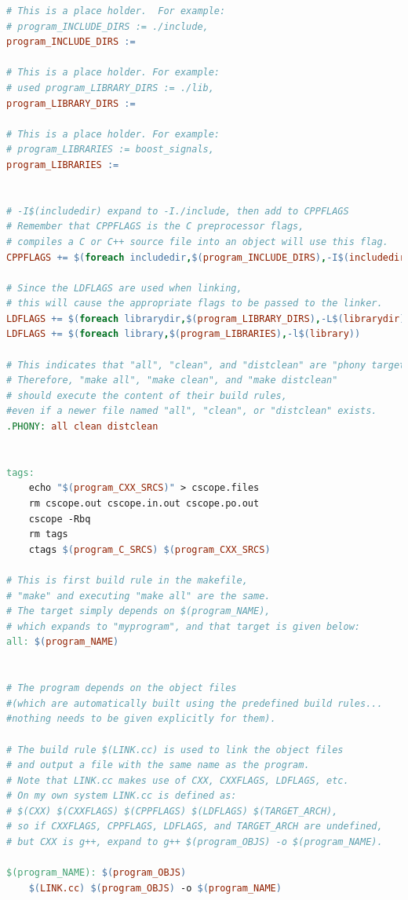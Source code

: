\documentclass[a4paper,12pt,twoside]{book}
\begin{document}
\begin{itemize}
\begin{lstlisting}[frame=single,  basicstyle=\small, language=make]
# This is a place holder.  For example:
# program_INCLUDE_DIRS := ./include, 
program_INCLUDE_DIRS :=

# This is a place holder. For example:
# used program_LIBRARY_DIRS := ./lib, 
program_LIBRARY_DIRS :=

# This is a place holder. For example:
# program_LIBRARIES := boost_signals, 
program_LIBRARIES :=


# -I$(includedir) expand to -I./include, then add to CPPFLAGS
# Remember that CPPFLAGS is the C preprocessor flags, 
# compiles a C or C++ source file into an object will use this flag.
CPPFLAGS += $(foreach includedir,$(program_INCLUDE_DIRS),-I$(includedir))

# Since the LDFLAGS are used when linking, 
# this will cause the appropriate flags to be passed to the linker.
LDFLAGS += $(foreach librarydir,$(program_LIBRARY_DIRS),-L$(librarydir))
LDFLAGS += $(foreach library,$(program_LIBRARIES),-l$(library))

# This indicates that "all", "clean", and "distclean" are "phony targets". 
# Therefore, "make all", "make clean", and "make distclean"
# should execute the content of their build rules, 
#even if a newer file named "all", "clean", or "distclean" exists.
.PHONY: all clean distclean


tags:
	echo "$(program_CXX_SRCS)" > cscope.files 
	rm cscope.out cscope.in.out cscope.po.out 
    cscope -Rbq 
	rm tags
	ctags $(program_C_SRCS) $(program_CXX_SRCS)
	 
# This is first build rule in the makefile, 
# "make" and executing "make all" are the same.
# The target simply depends on $(program_NAME), 
# which expands to "myprogram", and that target is given below:
all: $(program_NAME)


# The program depends on the object files 
#(which are automatically built using the predefined build rules... 
#nothing needs to be given explicitly for them).

# The build rule $(LINK.cc) is used to link the object files
# and output a file with the same name as the program. 
# Note that LINK.cc makes use of CXX, CXXFLAGS, LDFLAGS, etc.
# On my own system LINK.cc is defined as: 
# $(CXX) $(CXXFLAGS) $(CPPFLAGS) $(LDFLAGS) $(TARGET_ARCH),
# so if CXXFLAGS, CPPFLAGS, LDFLAGS, and TARGET_ARCH are undefined,
# but CXX is g++, expand to g++ $(program_OBJS) -o $(program_NAME).

$(program_NAME): $(program_OBJS)
    $(LINK.cc) $(program_OBJS) -o $(program_NAME)


\end{lstlisting}
\end{itemize}
\end{document}
